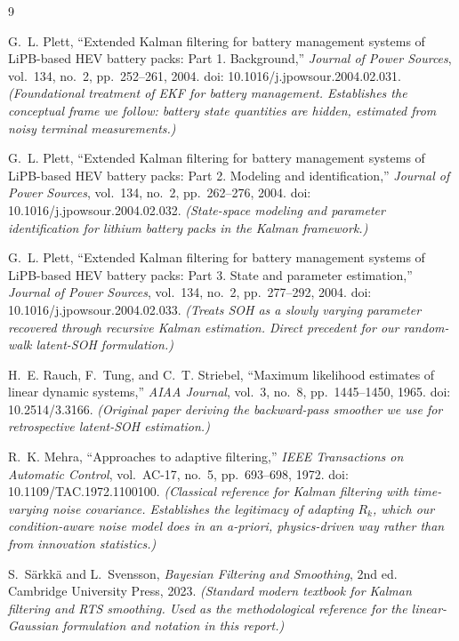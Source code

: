 \documentclass[11pt]{article}
\begin{document}
\begin{thebibliography}{9}

G.~L. Plett,
``Extended Kalman filtering for battery management systems of
LiPB-based HEV battery packs: Part 1. Background,''
\emph{Journal of Power Sources}, vol.~134, no.~2, pp.~252--261, 2004.
doi: 10.1016/j.jpowsour.2004.02.031.
\emph{(Foundational treatment of EKF for battery management. Establishes
the conceptual frame we follow: battery state quantities are hidden,
estimated from noisy terminal measurements.)}

G.~L. Plett,
``Extended Kalman filtering for battery management systems of
LiPB-based HEV battery packs: Part 2. Modeling and identification,''
\emph{Journal of Power Sources}, vol.~134, no.~2, pp.~262--276, 2004.
doi: 10.1016/j.jpowsour.2004.02.032.
\emph{(State-space modeling and parameter identification for lithium
battery packs in the Kalman framework.)}

G.~L. Plett,
``Extended Kalman filtering for battery management systems of
LiPB-based HEV battery packs: Part 3. State and parameter estimation,''
\emph{Journal of Power Sources}, vol.~134, no.~2, pp.~277--292, 2004.
doi: 10.1016/j.jpowsour.2004.02.033.
\emph{(Treats SOH as a slowly varying parameter recovered through
recursive Kalman estimation. Direct precedent for our random-walk
latent-SOH formulation.)}

H.~E. Rauch, F.~Tung, and C.~T. Striebel,
``Maximum likelihood estimates of linear dynamic systems,''
\emph{AIAA Journal}, vol.~3, no.~8, pp.~1445--1450, 1965.
doi: 10.2514/3.3166.
\emph{(Original paper deriving the backward-pass smoother we use for
retrospective latent-SOH estimation.)}

R.~K. Mehra,
``Approaches to adaptive filtering,''
\emph{IEEE Transactions on Automatic Control}, vol.~AC-17, no.~5,
pp.~693--698, 1972.
doi: 10.1109/TAC.1972.1100100.
\emph{(Classical reference for Kalman filtering with time-varying noise
covariance. Establishes the legitimacy of adapting \(R_k\), which our
condition-aware noise model does in an a-priori, physics-driven way
rather than from innovation statistics.)}

S.~S\"arkk\"a and L.~Svensson,
\emph{Bayesian Filtering and Smoothing}, 2nd ed.
Cambridge University Press, 2023.
\emph{(Standard modern textbook for Kalman filtering and RTS smoothing.
Used as the methodological reference for the linear-Gaussian formulation
and notation in this report.)}


\end{thebibliography}
\end{document}
